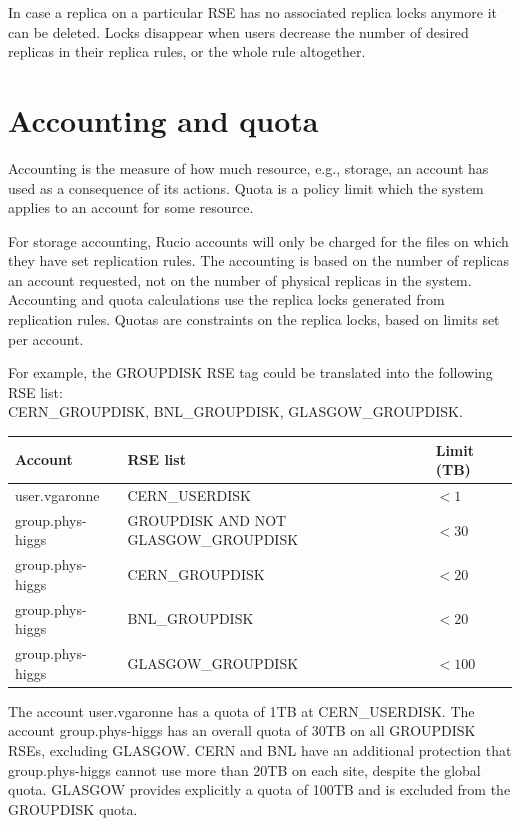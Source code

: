 \documentclass{atlasnote}
\begin{document}
In case a replica on a particular RSE has no associated replica locks anymore it can be deleted. Locks disappear when users decrease the number of desired replicas in their replica rules, or the whole rule altogether.

\section{Accounting and quota}
\label{overview_Accounting_and_quota:accounting-and-quota}

Accounting is the measure of how much resource, e.g., storage, an account has used as a consequence of its actions. Quota is a policy limit which the system applies to an account for some resource.

For storage accounting, Rucio accounts will only be charged for the files on which they have set replication rules. The accounting is based on the number of replicas an account requested, not on the number of physical replicas in the system. Accounting and quota calculations use the replica locks generated from replication rules. Quotas are constraints on the replica locks, based on limits set per account.

For example, the GROUPDISK RSE tag could be translated into the following RSE list:\\CERN\_GROUPDISK, BNL\_GROUPDISK, GLASGOW\_GROUPDISK.

\bigskip

\begin{tabular}{l p{9cm} p{2cm}}
\toprule
\textbf{Account} & \textbf{RSE list} & \textbf{Limit (TB)} \\
\midrule
user.vgaronne & CERN\_USERDISK & $< 1$ \\
group.phys-higgs & GROUPDISK AND NOT GLASGOW\_GROUPDISK & $< 30$ \\
group.phys-higgs & CERN\_GROUPDISK & $< 20$ \\
group.phys-higgs & BNL\_GROUPDISK & $< 20$ \\
group.phys-higgs & GLASGOW\_GROUPDISK & $< 100$ \\
\bottomrule
\end{tabular}

\bigskip

\noindent The account user.vgaronne has a quota of 1TB at CERN\_USERDISK. The account group.phys-higgs has an overall quota of 30TB on all GROUPDISK RSEs, excluding GLASGOW. CERN and BNL have an additional protection that group.phys-higgs cannot use more than 20TB on each site, despite the global quota. GLASGOW provides explicitly a quota of 100TB and is excluded from the GROUPDISK quota.
\end{document}
